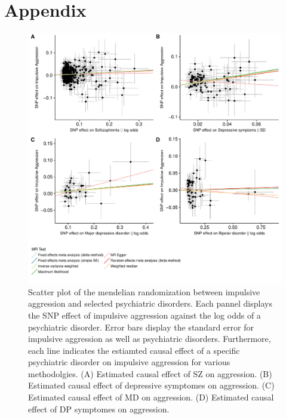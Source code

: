 \section{Appendix}
\label{sec:appendix}

\begin{figure}[htpb]
  \centering
  \includegraphics[width=0.8\linewidth]{./figures/mr_aggression.pdf}
  \caption{
    Scatter plot of the mendelian randomization between impulsive aggression and selected psychiatric disorders.
    Each pannel displays the SNP effect of impulsive aggression against the log odds of a psychiatric disorder.
    Error bars display the standard error for impulsive aggression as well as psychiatric disorders.
    Furthermore, each line indicates the estiamted causal effect of a specific psychiatric disorder on impulsive aggression for various methodolgies.
    (A) Estimated causal effect of SZ on aggression.
    (B) Estimated causal effect of depressive symptomes on aggression.
    (C) Estimated causal effect of MD on aggression.
    (D) Estimated causal effect of DP symptomes on aggression.
  }\label{fig:mr_aggression}
\end{figure}

